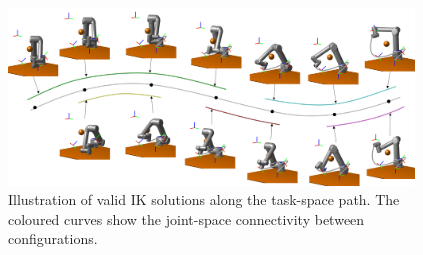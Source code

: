 \documentclass[letterpaper, 10 pt, conference]{ieeeconf}  %
\begin{document}
\begin{figure}[t]
\centering
\includegraphics[width=0.96\textwidth]{figures/case_study/comb_3}
\caption{Illustration of valid IK solutions along the task-space path. 
The coloured curves show the joint-space connectivity between configurations. }\label{fig:allpose}
\end{figure}
\end{document}
